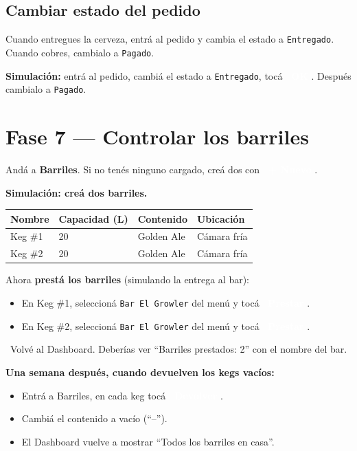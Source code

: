 \documentclass[11pt,a4paper]{report}
\newcommand{\appbtn}[1]{%
  \textcolor{white}{\colorbox{beer}{\footnotesize\sffamily\bfseries\ #1}}%
}
\begin{document}
\subsection{Cambiar estado del pedido}

Cuando entregues la cerveza, entrá al pedido y cambia el estado a \texttt{Entregado}. Cuando cobres, cambialo a \texttt{Pagado}.

\begin{simbox}
\textbf{Simulación:} entrá al pedido, cambiá el estado a \texttt{Entregado}, tocá \appbtn{OK}. Después cambialo a \texttt{Pagado}.
\end{simbox}

\section{Fase 7 — Controlar los barriles}

Andá a \textbf{Barriles}. Si no tenés ninguno cargado, creá dos con \appbtn{+ Nuevo}.

\begin{simbox}
\textbf{Simulación: creá dos barriles.}

\begin{tabular}{llll}
\toprule
\textbf{Nombre} & \textbf{Capacidad (L)} & \textbf{Contenido} & \textbf{Ubicación} \\
\midrule
Keg \#1 & 20 & Golden Ale & Cámara fría \\
Keg \#2 & 20 & Golden Ale & Cámara fría \\
\bottomrule
\end{tabular}

\medskip
Ahora \textbf{prestá los barriles} (simulando la entrega al bar):
\begin{itemize}
  \item En Keg \#1, seleccioná \texttt{Bar El Growler} del menú y tocá \appbtn{Prestar}.
  \item En Keg \#2, seleccioná \texttt{Bar El Growler} del menú y tocá \appbtn{Prestar}.
\end{itemize}

\medskip
\textcolor{accent}{\faArrowRight\ Volvé al Dashboard. Deberías ver ``Barriles prestados: 2'' con el nombre del bar.}

\medskip
\textbf{Una semana después, cuando devuelven los kegs vacíos:}
\begin{itemize}
  \item Entrá a Barriles, en cada keg tocá \appbtn{Devolver}.
  \item Cambiá el contenido a vacío (``--'').
  \item El Dashboard vuelve a mostrar ``Todos los barriles en casa''.
\end{itemize}
\end{simbox}
\end{document}
